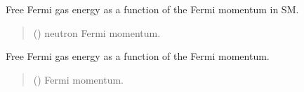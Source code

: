 \documentclass[letterpaper,10pt,english]{sphinxmanual}
\begin{document}

\begin{fulllineitems}
\label{\detokenize{source/api/setup_matter_ffg:nucleardatapy.matter.setup_ffg.effg_SM_nr}}
\pysigstartsignatures
{}
\pysigstopsignatures
\sphinxAtStartPar
Free Fermi gas energy as a function of the Fermi momentum in SM.
\begin{quote}\begin{description}
\sphinxAtStartPar
{} () \textendash{} neutron Fermi momentum.

\end{description}\end{quote}

\end{fulllineitems}


\begin{fulllineitems}
\label{\detokenize{source/api/setup_matter_ffg:nucleardatapy.matter.setup_ffg.effg_nr}}
\pysigstartsignatures
{}
\pysigstopsignatures
\sphinxAtStartPar
Free Fermi gas energy as a function of the Fermi momentum.
\begin{quote}\begin{description}
\sphinxAtStartPar
{} () \textendash{} Fermi momentum.

\end{description}\end{quote}

\end{fulllineitems}
\end{document}

